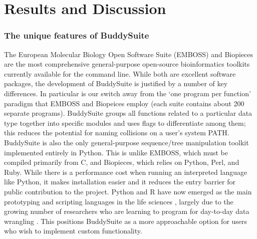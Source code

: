 \documentclass[nogrid]{MBE_article}%
\begin{document}
\section{Results and Discussion}
\subsubsection{The unique features of BuddySuite}
The European Molecular Biology Open Software Suite (EMBOSS) and Biopieces are the most comprehensive general-purpose open-source bioinformatics toolkits currently available for the command line. While both are excellent software packages, the development of BuddySuite is justified by a number of key differences. In particular is our switch away from the `one program per function' paradigm that EMBOSS and Biopeices employ (each suite contains about 200 separate programs). BuddySuite groups all functions related to a particular data type together into specific modules and uses flags to differentiate among them; this reduces the potential for naming collisions on a user's system PATH. BuddySuite is also the only general-purpose sequence/tree manipulation toolkit implemented entirely in Python. This is unlike EMBOSS, which must be compiled primarily from C, and Biopieces, which relies on Python, Perl, and Ruby. While there is a performance cost when running an interpreted language like Python, it makes installation easier and it reduces the entry barrier for public contribution to the project. Python and R have now emerged as the main prototyping and scripting languages in the life sciences \cite{Ekmekci:2016co}, largely due to the growing number of researchers who are learning to program for day-to-day data wrangling \cite{Hannay:2009hv}. This positions BuddySuite as a more approachable option for users who wish to implement custom functionality.
\end{document}
